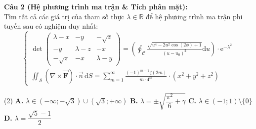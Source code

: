 \documentclass[12pt,a4paper]{article}
\begin{document}
\noindent\textbf{Câu 2 (Hệ phương trình ma trận & Tích phân mặt):}\\
Tìm tất cả các giá trị của tham số thực $\lambda \in \mathbb{R}$ để hệ phương trình ma trận phi tuyến sau có nghiệm duy nhất:
\[
\begin{cases}
\det \begin{pmatrix} 
\lambda - x & -y & -\sqrt{z} \\ 
-y & \lambda - z & -x \\ 
-\sqrt{z} & -x & \lambda - y 
\end{pmatrix} = \left( \oint_{\mathcal{C}} \frac{\sqrt{u^4 - 2u^2 \cos(2\phi) + 1}}{(u - u_0)^2} \mathrm{d}u \right) \cdot \mathrm{e}^{-\lambda^2} \\[18pt]
\displaystyle\iint_{\mathcal{S}} \left( \nabla \times \vec{\mathbf{F}} \right) \cdot \vec{n} \, \mathrm{d}S = \sum_{m=1}^{\infty} \frac{(-1)^{m-1} \zeta(2m)}{m \cdot 4^m} \cdot \left(x^2 + y^2 + z^2\right)
\end{cases}
\]
\begin{tasks}(2)
\task \textbf{A.} $\lambda \in \left(-\infty; -\sqrt{3}\right) \cup \left(\sqrt{3}; +\infty\right)$
\task \textbf{B.} $\lambda = \pm \sqrt{\dfrac{\pi^2}{6} + \gamma}$
\task \textbf{C.} $\lambda \in (-1; 1) \setminus \{0\}$
\task \textbf{D.} $\lambda = \dfrac{\sqrt{5} - 1}{2}$
\end{tasks}

\vspace{0.4cm}
\end{document}
